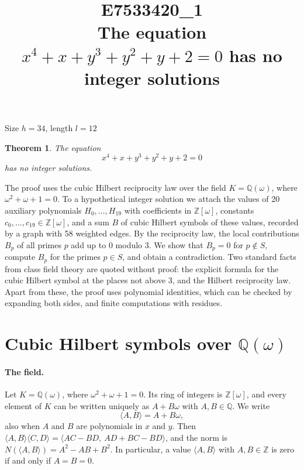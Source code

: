 \documentclass[11pt]{article}
\title{\textbf{E7533420\_1}\\[4pt] {\Large The equation $x^{4}+x+y^{3}+y^{2}+y+2=0$ has no integer solutions}}
\author{}
\date{}
\newtheorem{theorem}{Theorem}
\newcommand{\Z}{\mathbb{Z}}
\newcommand{\Q}{\mathbb{Q}}
\begin{document}
\maketitle
\vspace{-8ex}
\begin{center}
Size $h=34$, length $l=12$
\end{center}

\begin{theorem}\label{thm:main}
The equation
\begin{equation}\label{eq:main}
x^{4}+x+y^{3}+y^{2}+y+2=0
\end{equation}
has no integer solutions.
\end{theorem}

The proof uses the cubic Hilbert reciprocity law over the field $K=\Q(\omega)$, where $\omega^2+\omega+1=0$. To a hypothetical integer solution we attach the values of 20 auxiliary polynomials $H_0,\dots,H_{19}$ with coefficients in $\Z[\omega]$, constants $c_0,\dots,c_{19}\in\Z[\omega]$, and a sum $B$ of cubic Hilbert symbols of these values, recorded by a graph with 58 weighted edges. By the reciprocity law, the local contributions $B_p$ of all primes $p$ add up to $0$ modulo $3$. We show that $B_p=0$ for $p\notin S$, compute $B_p$ for the primes $p\in S$, and obtain a contradiction. Two standard facts from class field theory are quoted without proof: the explicit formula for the cubic Hilbert symbol at the places not above $3$, and the Hilbert reciprocity law. Apart from these, the proof uses polynomial identities, which can be checked by expanding both sides, and finite computations with residues.


\section{\texorpdfstring{Cubic Hilbert symbols over $\Q(\omega)$}{Cubic Hilbert symbols over Q(w)}}\label{sec:symbols}

\paragraph{The field.} Let $K=\Q(\omega)$, where $\omega^2+\omega+1=0$. Its ring of integers is $\Z[\omega]$, and every element of $K$ can be written uniquely as $A+B\omega$ with $A,B\in\Q$. We write
\[
\langle A,B\rangle=A+B\omega,
\]
also when $A$ and $B$ are polynomials in $x$ and $y$. Then $\langle A,B\rangle\langle C,D\rangle=\langle AC-BD,\ AD+BC-BD\rangle$, and the norm is $N(\langle A,B\rangle)=A^2-AB+B^2$. In particular, a value $\langle A,B\rangle$ with $A,B\in\Z$ is zero if and only if $A=B=0$.
\end{document}
